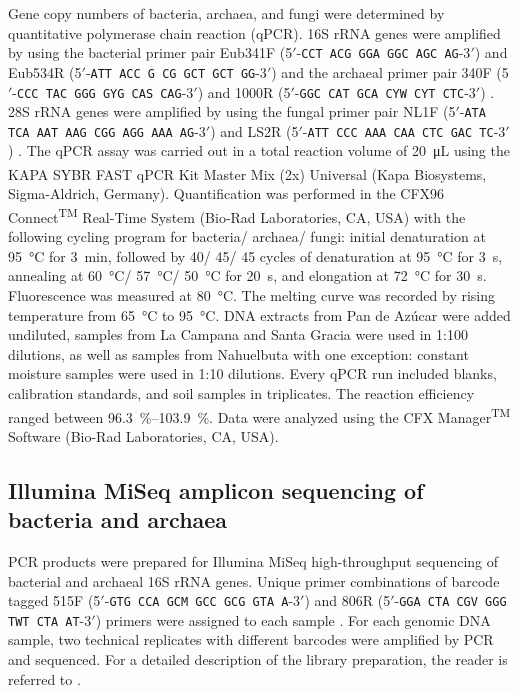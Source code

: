 Gene copy numbers of bacteria, archaea, and fungi were determined by quantitative polymerase chain reaction (qPCR). 
16S rRNA genes were amplified by using the bacterial primer pair Eub341F (5\('\)-\texttt{CCT ACG GGA GGC AGC AG}-3\('\)) and Eub534R (5\('\)-\texttt{ATT ACC G CG GCT GCT GG}-3\('\)) \citep{Muyzer1993} and the archaeal primer pair 340F (5\('\)-\texttt{CCC TAC GGG GYG CAS CAG}-3\('\)) and 1000R (5\('\)-\texttt{GGC CAT GCA CYW CYT CTC}-3\('\)) \citep{Gantner2011}. 
28S rRNA genes were amplified by using the fungal primer pair NL1F (5\('\)-\texttt{ATA TCA AAT AAG CGG AGG AAA AG}-3\('\)) and LS2R (5\('\)-\texttt{ATT CCC AAA CAA CTC GAC TC}-3\('\)) \citep{Bates2009}. 
The qPCR assay was carried out in a total reaction volume of \SI{20}{\micro\liter} using the KAPA SYBR\textsuperscript{\textregistered} FAST qPCR Kit Master Mix (2x) Universal (Kapa Biosystems, Sigma-Aldrich, Germany). 
Quantification was performed in the CFX96 Connect\textsuperscript{TM} Real-Time System (Bio-Rad Laboratories, CA, USA) with the following cycling program for bacteria/ archaea/ fungi: initial denaturation at \SI{95}{\degreeCelsius} for \SI{3}{\minute}, followed by 40/ 45/ 45 cycles of denaturation at \SI{95}{\degreeCelsius} for \SI{3}{\second}, annealing at \SI{60}{\degreeCelsius}/ \SI{57}{\degreeCelsius}/ \SI{50}{\degreeCelsius} for \SI{20}{\second}, and elongation at \SI{72}{\degreeCelsius} for \SI{30}{\second}. 
Fluorescence was measured at \SI{80}{\degreeCelsius}. 
The melting curve was recorded by rising temperature from \SI{65}{\degreeCelsius} to \SI{95}{\degreeCelsius}. 
DNA extracts from Pan de Az{\'u}car were added undiluted, samples from La Campana and Santa Gracia were used in 1:100 dilutions, as well as samples from Nahuelbuta with one exception: constant moisture samples were used in 1:10 dilutions. 
Every qPCR run included blanks, calibration standards, and soil samples in triplicates. 
The reaction efficiency ranged between \SIrange{96.3}{103.9}{\percent}. 
Data were analyzed using the CFX Manager\textsuperscript{TM} Software (Bio-Rad Laboratories, CA, USA).

\subsection{Illumina MiSeq amplicon sequencing of bacteria and archaea}

PCR products were prepared for Illumina MiSeq high-throughput sequencing of bacterial and archaeal 16S rRNA genes. 
Unique primer combinations of barcode tagged 515F (5\('\)-\texttt{GTG CCA GCM GCC GCG GTA A}-3\('\)) and 806R (5\('\)-\texttt{GGA CTA CGV GGG TWT CTA AT}-3\('\)) primers were assigned to each sample \citep{Caporaso2012}. 
For each genomic DNA sample, two technical replicates with different barcodes were amplified by PCR and sequenced. 
For a detailed description of the library preparation, the reader is referred to \citet{Moskwa2020}.

